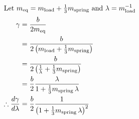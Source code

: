 \vspace{-2em}


\begin{align*}
\intertext{Let $m_{\mathrm{eq}} = m_{\mathrm{load}} + \tfrac{1}{3} m_{\mathrm{spring}}$ and $\lambda = m_{\mathrm{load}}^{-1}$}
\gamma &= \frac{b}{2 m_{\mathrm{eq}}} \\
       &= \frac{b}{2 \left(m_{\mathrm{load}} + \tfrac{1}{3} m_{\mathrm{spring}}\right)} \\
       &= \frac{b}{2 \left(\tfrac{1}{\lambda} + \tfrac{1}{3} m_{\mathrm{spring}}\right)} \\
       &= \frac{b}{2} \frac{\lambda}{1 + \tfrac{1}{3} m_{\mathrm{spring}} \, \lambda} \\
\therefore \frac{d \gamma}{d \lambda} &= \frac{b}{2} \frac{1}{\left(1 + \tfrac{1}{3} m_{\mathrm{spring}} \, \lambda\right)^2}
\end{align*}

\vspace{1em}

\lipsum[10-13]
